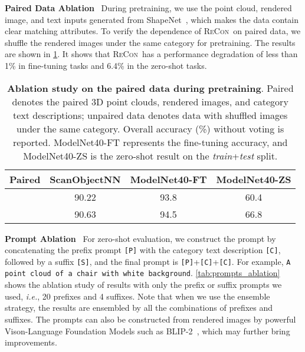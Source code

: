 \documentclass{article}
\theoremstyle{plain}
\theoremstyle{definition}
\theoremstyle{remark}
\def\ie{{\it{i.e.}}}
\def\recon{{\scshape ReCon}}
\begin{document}
\textbf{Paired Data Ablation}~
During pretraining, we use the point cloud, rendered image, and text inputs generated from ShapeNet~\citep{ShapeNet15}, which makes the data contain clear matching attributes. 
To verify the dependence of \recon\ on paired data, we shuffle the rendered images under the same category for pretraining. 
The results are shown in \cref{tab:nonpair}. 
It shows that \recon\ has a performance degradation of less than 1\% in fine-tuning tasks and 6.4\% in the zero-shot tasks. 
\begin{table}[!h]
\caption{
\textbf{Ablation study on the paired data during pretraining}. Paired denotes the paired 3D point clouds, rendered images, and category text descriptions; unpaired data denotes data with shuffled images under the same category.
Overall accuracy (\%) without voting is reported. ModelNet40-FT represents the fine-tuning accuracy, and ModelNet40-ZS is the zero-shot result on the \textit{train}+\textit{test} split.} \label{tab:nonpair}
\begin{center}
\begin{tabular}{cccc}
\toprule[0.95pt]
Paired &  ScanObjectNN & ModelNet40-FT & ModelNet40-ZS\\
\midrule[0.6pt]
 & 90.22 & 93.8 & 60.4\\
 & 90.63 & 94.5 & 66.8\\
\bottomrule[0.95pt]
\end{tabular}
\end{center}
\end{table} 
\textbf{Prompt Ablation}~
For zero-shot evaluation, we construct the prompt by concatenating the prefix prompt \texttt{[P]} with the category text description \texttt{[C]}, followed by a suffix \texttt{[S]}, and the final prompt is \texttt{[P]}+\texttt{[C]}+\texttt{[C]}. 
For example, \texttt{A point cloud of a chair with white background}.
\cref{tab:prompts_ablation} shows the ablation study of results with only the prefix or suffix prompts we used, \ie, 20 prefixes and 4 suffixes.
Note that when we use the ensemble strategy, the results are ensembled by all the combinations of prefixes and suffixes.
The prompts can also be constructed from rendered images by powerful Vison-Language Foundation Models such as BLIP-2~\citep{BLIP223}, which may further bring improvements.
\end{document}
